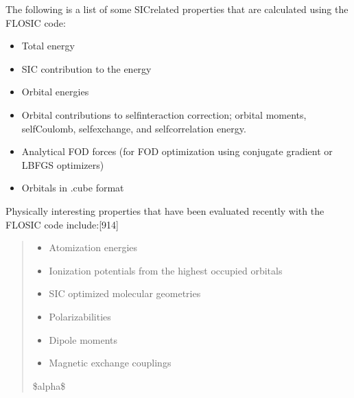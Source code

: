 \documentclass[letterpaper,10pt,english,openany,oneside]{sphinxmanual}
\begin{document}
\sphinxAtStartPar
The following is a list of some SIC\sphinxhyphen{}related properties that are calculated using the FLOSIC code:
\begin{itemize}
\item {} 
\sphinxAtStartPar
Total energy

\item {} 
\sphinxAtStartPar
SIC contribution to the energy

\item {} 
\sphinxAtStartPar
Orbital energies

\item {} 
\sphinxAtStartPar
Orbital contributions to self\sphinxhyphen{}interaction correction; orbital moments, self\sphinxhyphen{}Coulomb, self\sphinxhyphen{}exchange, and self\sphinxhyphen{}correlation energy.

\item {} 
\sphinxAtStartPar
Analytical FOD forces (for FOD optimization using conjugate gradient or LBFGS optimizers)

\item {} 
\sphinxAtStartPar
Orbitals in .cube format

\end{itemize}

\sphinxAtStartPar
Physically interesting properties that have been evaluated recently with the FLOSIC code include:{[}9\sphinxhyphen{}14{]}
\begin{quote}
\begin{itemize}
\item {} 
\sphinxAtStartPar
Atomization energies

\item {} 
\sphinxAtStartPar
Ionization potentials from the highest occupied orbitals

\item {} 
\sphinxAtStartPar
SIC optimized molecular geometries

\item {} 
\sphinxAtStartPar
Polarizabilities

\item {} 
\sphinxAtStartPar
Dipole moments

\item {} 
\sphinxAtStartPar
Magnetic exchange couplings

\end{itemize}

\sphinxAtStartPar
\$alpha\$
\end{quote}
\end{document}
